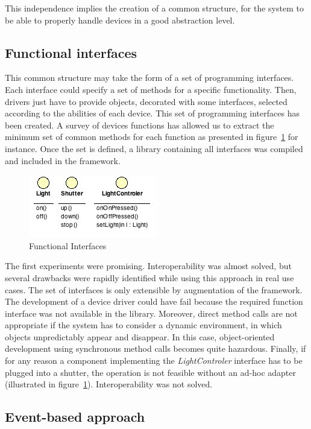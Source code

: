 This independence implies the creation of a common structure, for the system to be able to properly handle devices in a good abstraction level.

\subsection{Functional interfaces}

This common structure may take the form of a set of programming interfaces. Each interface could specify a set of methods for a specific functionality. Then, drivers just have to provide objects, decorated with some interfaces, selected according to the abilities of each device. This set of programming interfaces has been created. A survey of devices functions has allowed us to extract the minimum set of common methods for each function as presented in figure~\ref{fig:interfaces} for instance. Once the set is defined, a library containing all interfaces was compiled and included in the framework.\\
\begin{figure}[h!]
\centering
\includegraphics{part2/pics/FunctionalInterfaces.png}
\caption{Functional Interfaces}
\label{fig:interfaces}
\end{figure}
The first experiments were promising. Interoperability was almost solved, but several drawbacks were rapidly identified while using this approach in real use cases. The set of interfaces is only extensible by augmentation of the framework. The development of a device driver could have fail because the required function interface was not available in the library. Moreover, direct method calls are not appropriate if the system has to consider a dynamic environment, in which objects unpredictably appear and disappear. In this case, object-oriented development using synchronous method calls becomes quite hazardous. Finally, if for any reason a component implementing the {\it LightControler} interface has to be plugged into a shutter, the operation is not feasible without an ad-hoc adapter (illustrated in figure~\ref{fig:interfaces}). Interoperability was not solved.\\


\subsection{Event-based approach}

